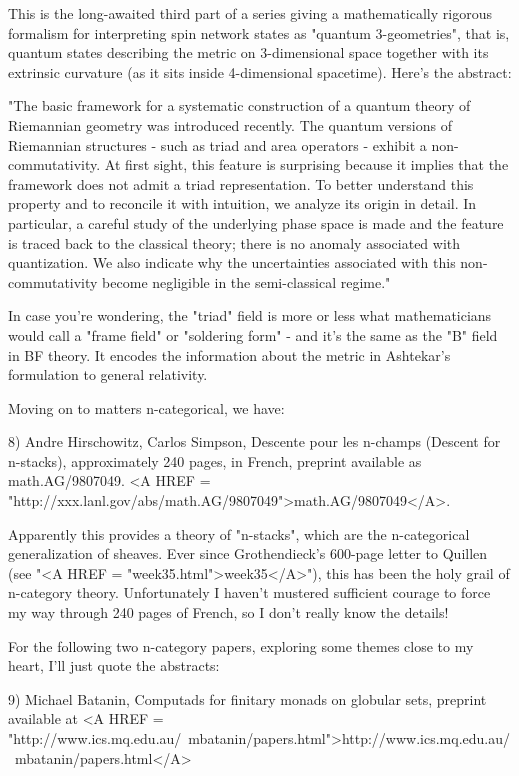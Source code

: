 This is the long-awaited third part of a series giving a mathematically
rigorous formalism for interpreting spin network states as "quantum
3-geometries", that is, quantum states describing the metric on
3-dimensional space together with its extrinsic curvature (as it sits
inside 4-dimensional spacetime).  Here's the abstract:

"The basic framework for a systematic construction of a quantum
theory of Riemannian geometry was introduced recently. The quantum
versions of Riemannian structures - such as triad and area operators -
exhibit a non-commutativity.  At first sight, this feature is
surprising because it implies that the framework does not admit a
triad representation. To better understand this property and to
reconcile it with intuition, we analyze its origin in detail. In
particular, a careful study of the underlying phase space is made and
the feature is traced back to the classical theory; there is no
anomaly associated with quantization.  We also indicate why the
uncertainties associated with this non-commutativity become negligible
in the semi-classical regime."

In case you're wondering, the "triad" field is more or less what 
mathematicians would call a "frame field" or "soldering form" - and
it's the same as the "B" field in BF theory.  It encodes the information
about the metric in Ashtekar's formulation to general relativity.

Moving on to matters n-categorical, we have:

8) Andre Hirschowitz, Carlos Simpson, Descente pour les n-champs 
(Descent for n-stacks), approximately 240 pages, in French, preprint
available as math.AG/9807049.
<A HREF = "http://xxx.lanl.gov/abs/math.AG/9807049">math.AG/9807049</A>.


Apparently this provides a theory of "n-stacks", which are the
n-categorical generalization of sheaves.  Ever since Grothendieck's
600-page letter to Quillen (see "<A HREF =
"week35.html">week35</A>"), this has been the holy grail of
n-category theory.  Unfortunately I haven't mustered sufficient courage
to force my way through 240 pages of French, so I don't really know the
details!

For the following two n-category papers, exploring some themes close
to my heart, I'll just quote the abstracts:

9) Michael Batanin, Computads for finitary monads on globular sets,
preprint available at <A HREF = "http://www.ics.mq.edu.au/~mbatanin/papers.html">http://www.ics.mq.edu.au/~mbatanin/papers.html</A>

